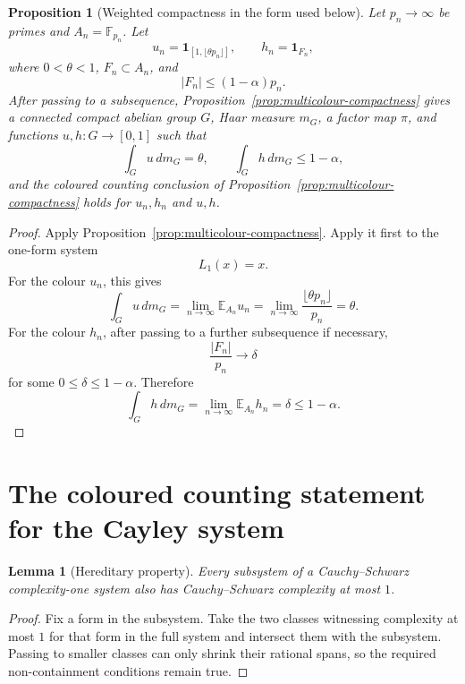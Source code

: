 \documentclass[11pt]{article}
\numberwithin{equation}{section}
\newtheorem{lemma}[theorem]{Lemma}
\newtheorem{proposition}[theorem]{Proposition}
\newcommand{\E}{\mathbb E}
\newcommand{\F}{\mathbb F}
\newcommand{\1}{\mathbf 1}
\begin{document}
\begin{proposition}[Weighted compactness in the form used below]
\label{prop:weighted-compactness}
Let \(p_n\to\infty\) be primes and \(A_n=\F_{p_n}\).  Let
\[
        u_n=\1_{[1,\lfloor\theta p_n\rfloor]},
        \qquad
        h_n=\1_{F_n},
\]
where \(0<\theta<1\), \(F_n\subset A_n\), and
\[
        |F_n|\le(1-\alpha)p_n.
\]
After passing to a subsequence, Proposition~\ref{prop:multicolour-compactness}
gives a connected compact abelian group \(G\), Haar measure \(m_G\), a
factor map \(\pi\), and functions \(u,h:G\to[0,1]\) such that
\[
        \int_G u\,dm_G=\theta,
        \qquad
        \int_G h\,dm_G\le1-\alpha,
\]
and the coloured counting conclusion of
Proposition~\ref{prop:multicolour-compactness} holds for \(u_n,h_n\) and
\(u,h\).
\end{proposition}

\begin{proof}
Apply Proposition~\ref{prop:multicolour-compactness}.  Apply it first
to the one-form system
\[
        L_1(x)=x.
\]
For the colour \(u_n\), this gives
\[
        \int_G u\,dm_G
        =
        \lim_{n\to\infty}\E_{A_n}u_n
        =
        \lim_{n\to\infty}\frac{\lfloor\theta p_n\rfloor}{p_n}
        =
        \theta.
\]
For the colour \(h_n\), after passing to a further subsequence if necessary,
\[
        \frac{|F_n|}{p_n}\to\delta
\]
for some \(0\le\delta\le1-\alpha\).  Therefore
\[
        \int_G h\,dm_G
        =
        \lim_{n\to\infty}\E_{A_n}h_n
        =
        \delta
        \le1-\alpha.
\]
\end{proof}

\section{The coloured counting statement for the Cayley system}
\label{sec:cayley-counting}

\begin{lemma}[Hereditary property]
\label{lem:cs-hereditary}
Every subsystem of a Cauchy--Schwarz complexity-one system also has
Cauchy--Schwarz complexity at most \(1\).
\end{lemma}

\begin{proof}
Fix a form in the subsystem.  Take the two classes witnessing complexity
at most \(1\) for that form in the full system and intersect them with the
subsystem.  Passing to smaller classes can only shrink their rational
spans, so the required non-containment conditions remain true.
\end{proof}
\end{document}
